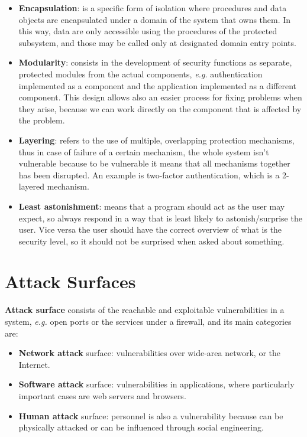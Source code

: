\documentclass[oneside]{academica}
\begin{document}
\begin{itemize}
  \item \textbf{Encapsulation}: is a specific form of isolation where procedures and data objects are encapsulated under a domain of the system that owns them. In this way, data are only accessible using the procedures of the protected subsystem, and those may be called only at designated domain entry points.
  \item \textbf{Modularity}: consists in the development of security functions as separate, protected modules from the actual components, \textit{e.g.} authentication implemented as a component and the application implemented as a different component.
    This design allows also an easier process for fixing problems when they arise, because we can work directly on the component that is affected by the problem.
  \item \textbf{Layering}: refers to the use of multiple, overlapping protection mechanisms, thus in case of failure of a certain mechanism, the whole system isn't vulnerable because to be vulnerable it means that all mechanisms together has been disrupted.
    An example is two-factor authentication, which is a 2-layered mechanism.
  \item \textbf{Least astonishment}: means that a program should act as the user may expect, so always respond in a way that is least likely to astonish/surprise the user. Vice versa the user should have the correct overview of what is the security level, so it should not be surprised when asked about something.
\end{itemize}

\section{Attack Surfaces}

\textbf{Attack surface} consists of the reachable and exploitable vulnerabilities in a system, \textit{e.g.} open ports or the services under a firewall, and its main categories are:
\begin{itemize}
  \item \textbf{Network attack} surface: vulnerabilities over wide-area network, or the Internet.
  \item \textbf{Software attack} surface: vulnerabilities in applications, where particularly important cases are web servers and browsers.
  \item \textbf{Human attack} surface: personnel is also a vulnerability because can be physically attacked or can be influenced through social engineering.
\end{itemize}
\end{document}

